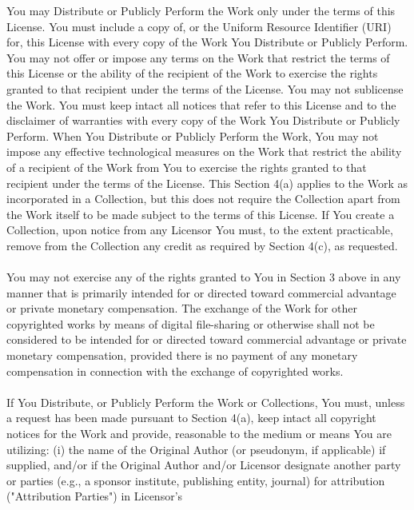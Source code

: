     You may Distribute or Publicly Perform the Work only under the terms of this
    License. You must include a copy of, or the Uniform Resource Identifier
    (URI) for, this License with every copy of the Work You Distribute or
    Publicly Perform. You may not offer or impose any terms on the Work that
    restrict the terms of this License or the ability of the recipient of the
    Work to exercise the rights granted to that recipient under the terms of the
    License. You may not sublicense the Work. You must keep intact all notices
    that refer to this License and to the disclaimer of warranties with every
    copy of the Work You Distribute or Publicly Perform. When You Distribute or
    Publicly Perform the Work, You may not impose any effective technological
    measures on the Work that restrict the ability of a recipient of the Work
    from You to exercise the rights granted to that recipient under the terms of
    the License. This Section 4(a) applies to the Work as incorporated in a
    Collection, but this does not require the Collection apart from the Work
    itself to be made subject to the terms of this License. If You create a
    Collection, upon notice from any Licensor You must, to the extent
    practicable, remove from the Collection any credit as required by Section
    4(c), as requested.
    \\ \\
    You may not exercise any of the rights granted to You in Section 3 above in
    any manner that is primarily intended for or directed toward commercial
    advantage or private monetary compensation. The exchange of the Work for
    other copyrighted works by means of digital file-sharing or otherwise shall
    not be considered to be intended for or directed toward commercial advantage
    or private monetary compensation, provided there is no payment of any
    monetary compensation in connection with the exchange of copyrighted works.
    \\ \\
    If You Distribute, or Publicly Perform the Work or Collections, You must,
    unless a request has been made pursuant to Section 4(a), keep intact all
    copyright notices for the Work and provide, reasonable to the medium or
    means You are utilizing: (i) the name of the Original Author (or pseudonym,
    if applicable) if supplied, and/or if the Original Author and/or Licensor
    designate another party or parties (e.g., a sponsor institute, publishing
    entity, journal) for attribution ("Attribution Parties") in Licensor's
